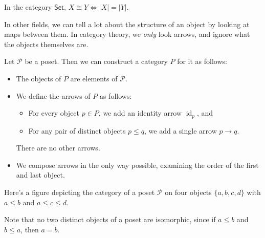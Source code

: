 \begin{remark}
    In the category $\mathsf{Set}$, $X\cong Y \iff |X|=|Y|$.
\end{remark}
In other fields, we can tell a lot about the structure of an object by looking at maps between them. In category theory, we \emph{only} look arrows, and ignore what the objects themselves are.
\begin{example}
   Let $\mathcal{P} $ be a poset. Then we can construct a category $P$ for it as follows:
   \begin{itemize}
       \item The objects of $P$ are elements of $\mathcal{P} $.
    \item We define the arrows of $P$ as follows:
        \begin{itemize}
            \item For every object $p\in P$, we add an identity arrow $\operatorname{id}_p$, and 
            \item For any pair of distinct objects $p\leq q$, we add a single arrow $p\to q$. 
        \end{itemize}
        There are no other arrows.
    \item We compose arrows in the only way possible, examining the order of the first and last object.
   \end{itemize}
   Here's a figure depicting the category of a poset $\mathcal{P} $ on four objects $\{a,b,c,d\} $ with $a\leq b$ and $a\leq c\leq d$.
            \begin{figure}[H]
                \centering
            \end{figure}
            Note that no two distinct objects of a poset are isomorphic, since if $a \leq b$ and $b \leq a$, then $a=b$.
\end{example}
